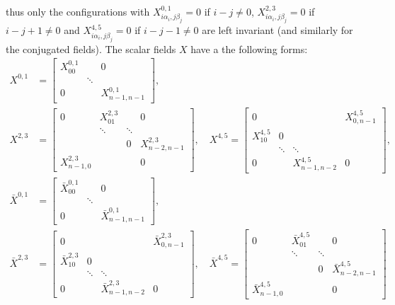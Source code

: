 \documentclass{worksheetclass}
\begin{document}
        thus only the configurations with $X^{0,1}_{i\alpha_i,j\beta_j}=0$ if $i-j\neq0$, $X^{2,3}_{i\alpha_i,j\beta_j}=0$ if $i-j+1\neq0$ and $X^{4,5}_{i\alpha_i,j\beta_j}=0$ if $i-j-1\neq0$ are left invariant (and similarly for the conjugated fields). The scalar fields $X$ have a the following forms:
        {\small
        \begin{align}
            X^{0,1}&=
            \begin{bmatrix}
                X^{0,1}_{00} &  & 0 \\
                 & \ddots & \\
                0 & & X^{0,1}_{n-1,n-1}
            \end{bmatrix},\\
            X^{2,3}&=
            \begin{bmatrix}
                0 & X^{2,3}_{01} & & 0 \\
                 & \ddots & \ddots & \\
                 & & 0 & X^{2,3}_{n-2,n-1} \\
                X^{2,3}_{n-1,0} & & & 0 
            \end{bmatrix},\quad
            X^{4,5}=
            \begin{bmatrix}
                0 & & & X^{4,5}_{0,n-1} \\
                X^{4,5}_{10} & 0 & & \\
                 & \ddots & \ddots  & \\
                0 & & X^{4,5}_{n-1,n-2} & 0
            \end{bmatrix},\\
            \bar{X}^{0,1}&=
            \begin{bmatrix}
                \bar{X}^{0,1}_{00} &  & 0 \\
                 & \ddots & \\
                0 & & \bar{X}^{0,1}_{n-1,n-1}
            \end{bmatrix},\\
            \bar{X}^{2,3}&=
            \begin{bmatrix}
                0 & & & \bar{X}^{2,3}_{0,n-1} \\
                \bar{X}^{2,3}_{10} & 0 & & \\
                 & \ddots & \ddots  & \\
                0 & & \bar{X}^{2,3}_{n-1,n-2} & 0
            \end{bmatrix},\quad
            \bar{X}^{4,5}=
            \begin{bmatrix}
                0 & \bar{X}^{4,5}_{01} & & 0 \\
                 & \ddots & \ddots & \\
                 & & 0 & \bar{X}^{4,5}_{n-2,n-1} \\
                 \bar{X}^{4,5}_{n-1,0} & & & 0
            \end{bmatrix}
        \end{align}}
\end{document}
